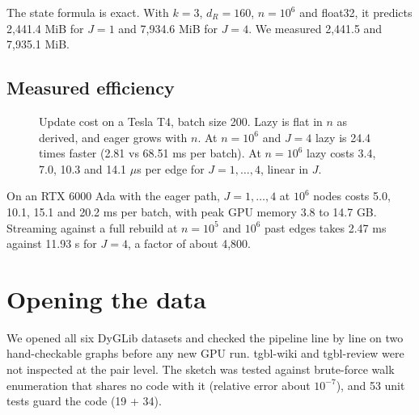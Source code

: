 \documentclass[11pt,a4paper]{article}
\theoremstyle{remark}
\begin{document}
The state formula is exact. With $k=3$, $d_R=160$, $n=10^6$ and float32, it predicts 2,441.4 MiB for $J=1$ and 7,934.6 MiB for $J=4$. We measured 2,441.5 and 7,935.1 MiB.

\subsection{Measured efficiency}
\begin{figure}[h]\centering
{}
\caption{Update cost on a Tesla T4, batch size 200. Lazy is flat in $n$ as derived, and eager grows with $n$. At $n=10^6$ and $J=4$ lazy is 24.4 times faster (2.81 vs 68.51 ms per batch). At $n=10^6$ lazy costs 3.4, 7.0, 10.3 and 14.1 $\mu$s per edge for $J=1,\dots,4$, linear in $J$.}\label{fig:lazy}
\end{figure}

On an RTX 6000 Ada with the eager path, $J=1,\dots,4$ at $10^6$ nodes costs 5.0, 10.1, 15.1 and 20.2 ms per batch, with peak GPU memory 3.8 to 14.7 GB. Streaming against a full rebuild at $n=10^5$ and $10^6$ past edges takes 2.47 ms against 11.93 s for $J=4$, a factor of about 4,800.

\section{Opening the data}\label{sec:data}
We opened all six DyGLib datasets and checked the pipeline line by line on two hand-checkable graphs before any new GPU run. tgbl-wiki and tgbl-review were not inspected at the pair level. The sketch was tested against brute-force walk enumeration that shares no code with it (relative error about $10^{-7}$), and 53 unit tests guard the code (19 + 34).
\end{document}
